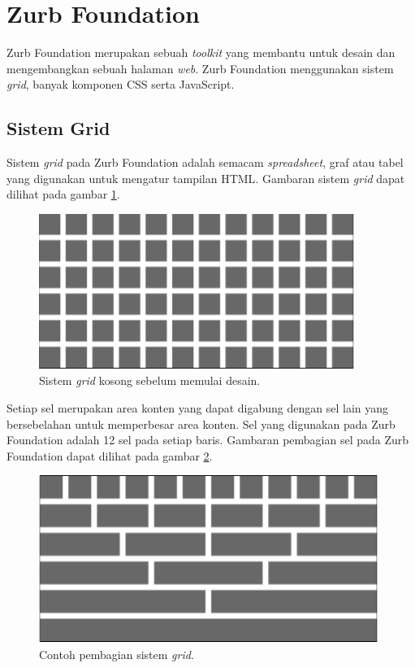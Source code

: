 \section{Zurb Foundation}
\label{sec:zurbfoundation}

Zurb Foundation \cite{zurbfoundationbook} merupakan sebuah \textit{toolkit} yang membantu untuk desain dan mengembangkan sebuah halaman \textit{web}. Zurb Foundation menggunakan sistem \textit{grid}, banyak komponen CSS serta JavaScript. 

\subsection{Sistem Grid}
Sistem \textit{grid} pada Zurb Foundation adalah semacam \textit{spreadsheet}, graf atau tabel yang digunakan untuk mengatur tampilan HTML. Gambaran sistem \textit{grid} dapat dilihat pada gambar \ref{fig:2_zurb_grid_blank}.

\begin{figure}[H]
	\centering
	\includegraphics[scale=0.5]{Gambar/zurb-gridblank}
	\caption{Sistem \textit{grid} kosong sebelum memulai desain.} 
	\label{fig:2_zurb_grid_blank}
\end{figure}

Setiap sel merupakan area konten yang dapat digabung dengan sel lain yang bersebelahan untuk memperbesar area konten. Sel yang digunakan pada Zurb Foundation adalah 12 sel pada setiap baris. Gambaran pembagian sel pada Zurb Foundation dapat dilihat pada gambar \ref{fig:2_zurb_grid}.

\begin{figure}[H]
	\centering
	\includegraphics[scale=0.5]{Gambar/zurb-grid}
	\caption{Contoh pembagian sistem \textit{grid}.} 
	\label{fig:2_zurb_grid}
\end{figure}

